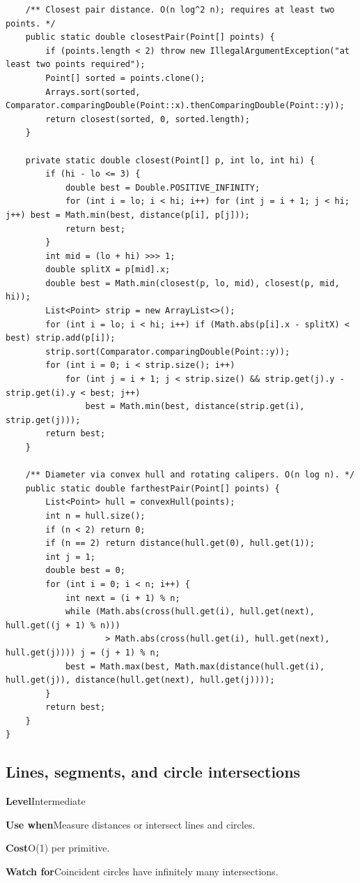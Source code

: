 \documentclass[10pt,letterpaper]{article}
\newcommand{\entrylabel}[1]{\textcolor{accent}{\bfseries #1}}
\begin{document}
\begin{lstlisting}
    /** Closest pair distance. O(n log^2 n); requires at least two points. */
    public static double closestPair(Point[] points) {
        if (points.length < 2) throw new IllegalArgumentException("at least two points required");
        Point[] sorted = points.clone();
        Arrays.sort(sorted, Comparator.comparingDouble(Point::x).thenComparingDouble(Point::y));
        return closest(sorted, 0, sorted.length);
    }

    private static double closest(Point[] p, int lo, int hi) {
        if (hi - lo <= 3) {
            double best = Double.POSITIVE_INFINITY;
            for (int i = lo; i < hi; i++) for (int j = i + 1; j < hi; j++) best = Math.min(best, distance(p[i], p[j]));
            return best;
        }
        int mid = (lo + hi) >>> 1;
        double splitX = p[mid].x;
        double best = Math.min(closest(p, lo, mid), closest(p, mid, hi));
        List<Point> strip = new ArrayList<>();
        for (int i = lo; i < hi; i++) if (Math.abs(p[i].x - splitX) < best) strip.add(p[i]);
        strip.sort(Comparator.comparingDouble(Point::y));
        for (int i = 0; i < strip.size(); i++)
            for (int j = i + 1; j < strip.size() && strip.get(j).y - strip.get(i).y < best; j++)
                best = Math.min(best, distance(strip.get(i), strip.get(j)));
        return best;
    }

    /** Diameter via convex hull and rotating calipers. O(n log n). */
    public static double farthestPair(Point[] points) {
        List<Point> hull = convexHull(points);
        int n = hull.size();
        if (n < 2) return 0;
        if (n == 2) return distance(hull.get(0), hull.get(1));
        int j = 1;
        double best = 0;
        for (int i = 0; i < n; i++) {
            int next = (i + 1) % n;
            while (Math.abs(cross(hull.get(i), hull.get(next), hull.get((j + 1) % n)))
                    > Math.abs(cross(hull.get(i), hull.get(next), hull.get(j)))) j = (j + 1) % n;
            best = Math.max(best, Math.max(distance(hull.get(i), hull.get(j)), distance(hull.get(next), hull.get(j))));
        }
        return best;
    }
}
\end{lstlisting}
\subsection{Lines, segments, and circle intersections}
\begin{guidebox}\small
\entrylabel{Level}\quad Intermediate\par
\entrylabel{Use when}\quad Measure distances or intersect lines and circles.\par
\entrylabel{Cost}\quad O(1) per primitive.\par
\entrylabel{Watch for}\quad Coincident circles have infinitely many intersections.\par
\end{guidebox}
\end{document}
